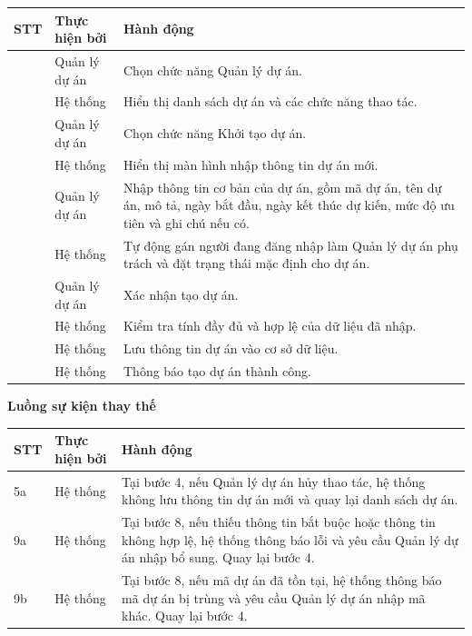 \documentclass[../DoAn.tex]{subfiles}
\begin{document}
{\ucTableText
\begin{longtable}{|>{\centering\arraybackslash}p{}|p{}|p{}|}
\hline
\rowcolor{ucHeaderBg}\textbf{STT} & \textbf{Thực hiện bởi} & \textbf{Hành động} \\ \hline
1 & Quản lý dự án & Chọn chức năng Quản lý dự án. \\ \hline
2 & Hệ thống & Hiển thị danh sách dự án và các chức năng thao tác. \\ \hline
3 & Quản lý dự án & Chọn chức năng Khởi tạo dự án. \\ \hline
4 & Hệ thống & Hiển thị màn hình nhập thông tin dự án mới. \\ \hline
5 & Quản lý dự án & Nhập thông tin cơ bản của dự án, gồm mã dự án, tên dự án, mô tả, ngày bắt đầu, ngày kết thúc dự kiến, mức độ ưu tiên và ghi chú nếu có. \\ \hline
6 & Hệ thống & Tự động gán người đang đăng nhập làm Quản lý dự án phụ trách và đặt trạng thái mặc định cho dự án. \\ \hline
7 & Quản lý dự án & Xác nhận tạo dự án. \\ \hline
8 & Hệ thống & Kiểm tra tính đầy đủ và hợp lệ của dữ liệu đã nhập. \\ \hline
9 & Hệ thống & Lưu thông tin dự án vào cơ sở dữ liệu. \\ \hline
10 & Hệ thống & Thông báo tạo dự án thành công. \\ \hline
\end{longtable}
}

\textbf{Luồng sự kiện thay thế}

{\ucTableText
\begin{longtable}{|>{\centering\arraybackslash}p{}|p{}|p{}|}
\hline
\rowcolor{ucHeaderBg}\textbf{STT} & \textbf{Thực hiện bởi} & \textbf{Hành động} \\ \hline
5a & Hệ thống & Tại bước 4, nếu Quản lý dự án hủy thao tác, hệ thống không lưu thông tin dự án mới và quay lại danh sách dự án. \\ \hline
9a & Hệ thống & Tại bước 8, nếu thiếu thông tin bắt buộc hoặc thông tin không hợp lệ, hệ thống thông báo lỗi và yêu cầu Quản lý dự án nhập bổ sung. Quay lại bước 4. \\ \hline
9b & Hệ thống & Tại bước 8, nếu mã dự án đã tồn tại, hệ thống thông báo mã dự án bị trùng và yêu cầu Quản lý dự án nhập mã khác. Quay lại bước 4. \\ \hline
\end{longtable}
}
\end{document}
